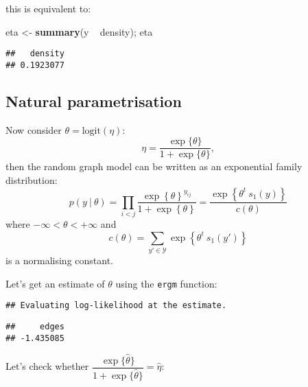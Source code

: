 \documentclass[]{book}
\newenvironment{Shaded}{\begin{snugshade}}{\end{snugshade}}
\newcommand{\KeywordTok}[1]{\textcolor[rgb]{0.13,0.29,0.53}{\textbf{{#1}}}}
\newcommand{\DecValTok}[1]{\textcolor[rgb]{0.00,0.00,0.81}{{#1}}}
\newcommand{\StringTok}[1]{\textcolor[rgb]{0.31,0.60,0.02}{{#1}}}
\newcommand{\NormalTok}[1]{{#1}}
\begin{document}
this is equivalent to:

\begin{Shaded}
\begin{Highlighting}[]
\NormalTok{eta <-}\StringTok{ }\KeywordTok{summary}\NormalTok{(y ~}\StringTok{ }\NormalTok{density); eta}
\end{Highlighting}
\end{Shaded}

\begin{verbatim}
##   density 
## 0.1923077
\end{verbatim}

\subsection{Natural parametrisation}\label{natural-parametrisation}

Now consider \(\theta = \mathrm{logit}(\eta)\): \[
\eta = \frac{\exp \{ \theta \} }{1 + \exp \{ \theta \}},
\] then the random graph model can be written as an exponential family
distribution: \[
p(y\ |\ \theta) = \prod_{i < j}
\frac{\exp \left\lbrace \theta \right\rbrace^{y_{ij}}}
     {1 + \exp \left\lbrace \theta \right\rbrace}
=
\frac{\exp\left\lbrace \theta^t\ s_1(y) \right\rbrace}
     {c(\theta)}
\] where \(-\infty < \theta < +\infty\) and \[
c(\theta) 
=
\sum_{y' \in \mathcal{Y}} \exp\left\lbrace \theta^t\ s_1(y') \right\rbrace
\] is a normalising constant.

Let's get an estimate of \(\theta\) using the \texttt{ergm} function:

\begin{Shaded}
\end{Shaded}

\begin{verbatim}
## Evaluating log-likelihood at the estimate.
\end{verbatim}

\begin{verbatim}
##     edges 
## -1.435085
\end{verbatim}

Let's check whether
\(\dfrac{\exp \{ \hat{\theta} \} }{1 + \exp \{ \hat{\theta} \}} = \hat{\eta}:\)

\begin{Shaded}
\end{Shaded}
\end{document}
